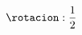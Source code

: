 \documentclass[preview]{standalone}
\begin{document}
\begin{align*}
\rotacion: \frac{1}{2}
\end{align*}
\end{document}
